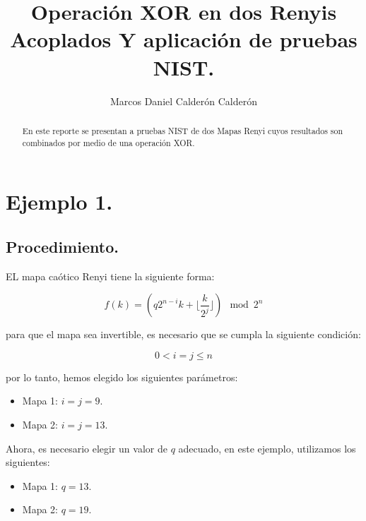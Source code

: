 \documentclass[12pt,3p]{elsarticle}
\begin{document}
\begin{frontmatter}

\title{Operación XOR en dos Renyis Acoplados Y aplicación de pruebas NIST.}



\author{Marcos Daniel Calderón Calderón}







\begin{abstract}
En este reporte se presentan a pruebas NIST de dos Mapas Renyi cuyos resultados son combinados por medio de una operación XOR.
\end{abstract}



\end{frontmatter}

\section{Ejemplo 1.}

\subsection{Procedimiento.}
EL mapa caótico Renyi tiene la siguiente forma:

\begin{equation}
f(k)=  \left(  q2^{n-i}k +  \lfloor \frac{k}{2^{j}} \rfloor   \right) \mod{ 2^{n}}
\end{equation}

para que el mapa sea invertible, es necesario que se cumpla la siguiente condición:

\begin{equation}
0 < i  = j \leq n
\end{equation}

por lo tanto, hemos elegido los siguientes parámetros:



\begin{itemize}
\item Mapa 1: $i = j = 9$.


\item Mapa 2: $i = j = 13$.
\end{itemize}

Ahora, es necesario elegir un valor de $q$ adecuado, en este ejemplo, utilizamos los siguientes:

\begin{itemize}
\item Mapa 1: $q = 13.$
\item Mapa 2: $q = 19.$
\end{itemize}
\end{document}
